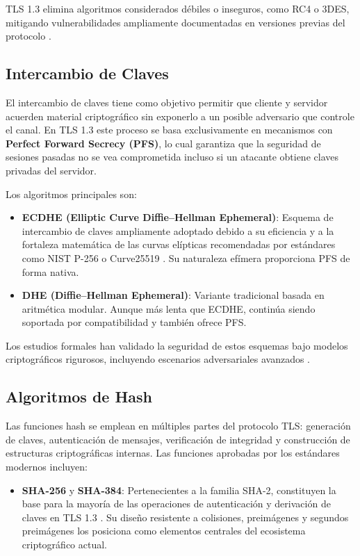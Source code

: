 TLS 1.3 elimina algoritmos considerados débiles o inseguros, como RC4 o 3DES, mitigando vulnerabilidades ampliamente documentadas en versiones previas del protocolo \cite{rfc7525}.

\subsection{Intercambio de Claves}

El intercambio de claves tiene como objetivo permitir que cliente y servidor acuerden material criptográfico sin exponerlo a un posible adversario que controle el canal. En TLS 1.3 este proceso se basa exclusivamente en mecanismos con \textbf{Perfect Forward Secrecy (PFS)}, lo cual garantiza que la seguridad de sesiones pasadas no se vea comprometida incluso si un atacante obtiene claves privadas del servidor.

Los algoritmos principales son:

\begin{itemize}
    \item \textbf{ECDHE (Elliptic Curve Diffie–Hellman Ephemeral)}: Esquema de intercambio de claves ampliamente adoptado debido a su eficiencia y a la fortaleza matemática de las curvas elípticas recomendadas por estándares como NIST P-256 o Curve25519 \cite{krawczyk2016}. Su naturaleza efímera proporciona PFS de forma nativa.
    
    \item \textbf{DHE (Diffie–Hellman Ephemeral)}: Variante tradicional basada en aritmética modular. Aunque más lenta que ECDHE, continúa siendo soportada por compatibilidad y también ofrece PFS.
\end{itemize}

Los estudios formales han validado la seguridad de estos esquemas bajo modelos criptográficos rigurosos, incluyendo escenarios adversariales avanzados \cite{dowling2015}.

\subsection{Algoritmos de Hash}

Las funciones hash se emplean en múltiples partes del protocolo TLS: generación de claves, autenticación de mensajes, verificación de integridad y construcción de estructuras criptográficas internas. Las funciones aprobadas por los estándares modernos incluyen:

\begin{itemize}
    \item \textbf{SHA-256} y \textbf{SHA-384}: Pertenecientes a la familia SHA-2, constituyen la base para la mayoría de las operaciones de autenticación y derivación de claves en TLS 1.3 \cite{rfc8446}. Su diseño resistente a colisiones, preimágenes y segundos preimágenes los posiciona como elementos centrales del ecosistema criptográfico actual.
\end{itemize}

